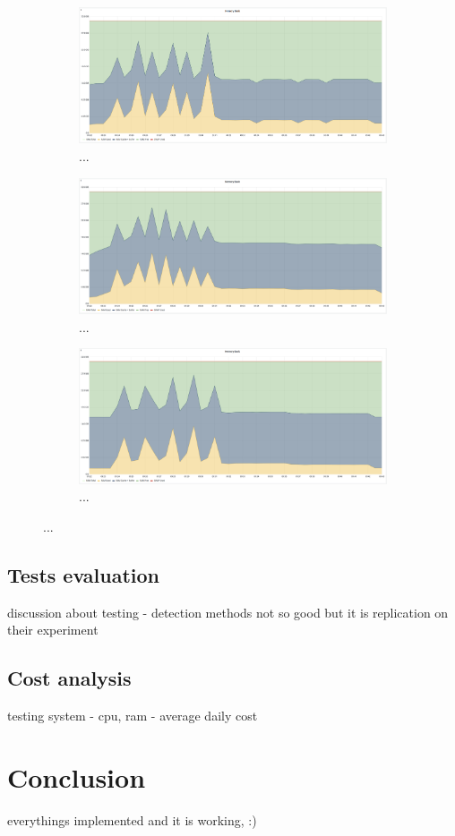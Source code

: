 \begin{figure}[H]
    \begin{subfigure}[h]{0.5\linewidth}
        \centering
        \includegraphics[width=1\linewidth]{other-fig/tests/overload_ram1.png}
        \caption{...}
    \end{subfigure}
    \hfill
    \begin{subfigure}[h]{0.5\linewidth}
        \centering
        \includegraphics[width=1\linewidth]{other-fig/tests/overload_ram2.png}
        \caption{...}
    \end{subfigure}
    \begin{subfigure}[h]{1\linewidth}
        \centering
        \includegraphics[width=0.5\linewidth]{other-fig/tests/overload_ram3.png}
        \caption{...}
    \end{subfigure}
    \caption{...}
\end{figure}

\section{Tests evaluation}
discussion about testing - detection methods not so good but it is replication on their experiment
\section{Cost analysis}
testing system - cpu, ram - average daily cost 

\chapter{Conclusion}
everythings implemented and it is working, :)

